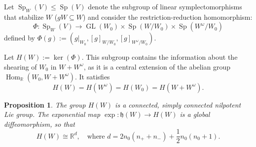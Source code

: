 \documentclass[12pt, final]{article}
\def\R{\mathbb{R}}
\def\Hom{\operatorname{Hom}}
\def\Sp{\operatorname{Sp}}
\def\GL{\operatorname{GL}}
\newtheorem{proposition}[theorem]{Proposition}
\begin{document}
Let $\Sp_W(V)\le \Sp(V)$ denote the subgroup of linear symplectomorphisms that stabilize $W$ ($gW \subseteq W$) and consider the restriction-reduction homomorphism:
\[
\Phi: \Sp_W(V) \longrightarrow \GL(W_0) \times \Sp(W/W_0) \times \Sp(W^\omega/W_0)
\]
defined by $\Phi(g) := (g|_{W_0}, [g]_{W/W_0}, [g]_{W^\omega/W_0})$.

Let $H(W) := \ker(\Phi)$. This subgroup contains the information about the shearing of $W_0$ in $W + W^\omega$, as it is a central extension of the abelian group $\Hom_\R(W_0, W+W^\omega)$. It satisfies
\[ H(W) = H(W^\omega) = H(W_0) = H(W + W^\omega).\]

\begin{proposition}
The group $H(W)$ is a connected, simply connected nilpotent Lie group. The exponential map $\exp: \mathfrak{h}(W) \to H(W)$ is a global diffeomorphism, so that
\[
H(W) \cong \R^d, \quad \text{where } d = 2n_0(n_+ + n_-) + \frac{1}{2}n_0(n_0+1).
\]
\end{proposition}
\end{document}

